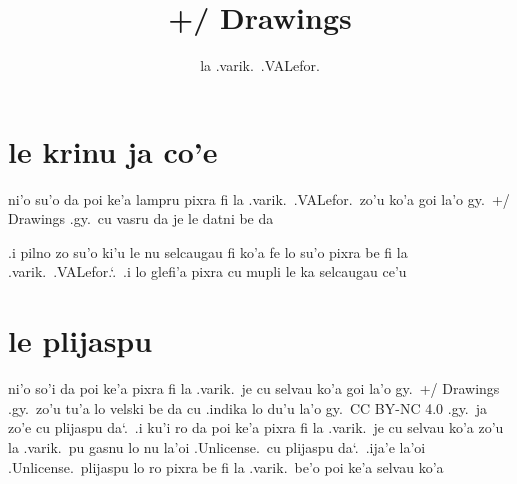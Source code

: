 \documentclass{report}
\title{+/ Drawings}
\author{la .varik.\ .VALefor.}
\newcommand\sds{\spacefactor\sfcode`.\ \space}
\begin{document}
\maketitle{}
\tableofcontents{}
\chapter{le krinu ja co'e}
ni'o su'o da poi ke'a lampru pixra fi la .varik.\ .VALefor.\ zo'u ko'a goi la'o gy.\ +/ Drawings .gy.\ cu vasru da je le datni be da

.i pilno zo su'o ki'u le nu selcaugau fi ko'a fe lo su'o pixra be fi la .varik.\ .VALefor.\sds .i lo glefi'a pixra cu mupli le ka selcaugau ce'u

\chapter{le plijaspu}
ni'o so'i da poi ke'a pixra fi la .varik.\ je cu selvau ko'a goi la'o gy.\ +/ Drawings .gy.\ zo'u tu'a lo velski be da cu .indika lo du'u la'o gy.\ CC BY-NC 4.0 .gy.\ ja zo'e cu plijaspu da\sds  .i ku'i ro da poi ke'a pixra fi la .varik.\ je cu selvau ko'a zo'u la .varik.\ pu gasnu lo nu la'oi .Unlicense.\ cu plijaspu da\sds  .ija'e la'oi .Unlicense.\ plijaspu lo ro pixra be fi la .varik.\ be'o poi ke'a selvau ko'a
\end{document}
